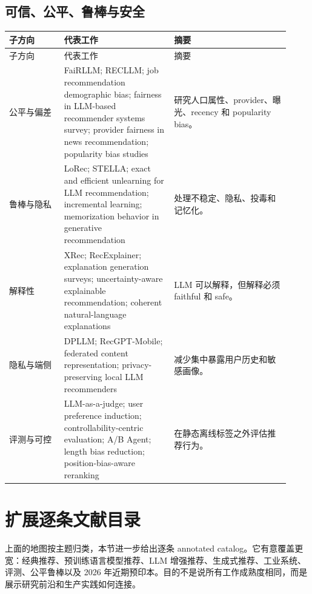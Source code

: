 \documentclass[UTF8,fontset=fandol,11pt]{ctexart}
\begin{document}
\subsection{可信、公平、鲁棒与安全}

\small
\begin{longtable}{@{}p{0.18\linewidth}p{0.36\linewidth}p{0.38\linewidth}@{}}
\toprule
子方向 & 代表工作 & 摘要\\
\midrule
\endfirsthead
\toprule
子方向 & 代表工作 & 摘要\\
\midrule
\endhead
公平与偏差 & FaiRLLM; RECLLM; job recommendation demographic bias; fairness in LLM-based recommender systems survey; provider fairness in news recommendation; popularity bias studies & 研究人口属性、provider、曝光、recency 和 popularity bias。\\
鲁棒与隐私 & LoRec; STELLA; exact and efficient unlearning for LLM recommendation; incremental learning; memorization behavior in generative recommendation & 处理不稳定、隐私、投毒和记忆化。\\
解释性 & XRec; RecExplainer; explanation generation surveys; uncertainty-aware explainable recommendation; coherent natural-language explanations & LLM 可以解释，但解释必须 faithful 和 safe。\\
隐私与端侧 & DPLLM; RecGPT-Mobile; federated content representation; privacy-preserving local LLM recommenders & 减少集中暴露用户历史和敏感画像。\\
评测与可控 & LLM-as-a-judge; user preference induction; controllability-centric evaluation; A/B Agent; length bias reduction; position-bias-aware reranking & 在静态离线标签之外评估推荐行为。\\
\bottomrule
\end{longtable}
\normalsize

\section{扩展逐条文献目录}

上面的地图按主题归类，本节进一步给出逐条 annotated catalog。它有意覆盖更宽：经典推荐、预训练语言模型推荐、LLM 增强推荐、生成式推荐、工业系统、评测、公平鲁棒以及 2026 年近期预印本。目的不是说所有工作成熟度相同，而是展示研究前沿和生产实践如何连接。
\end{document}
